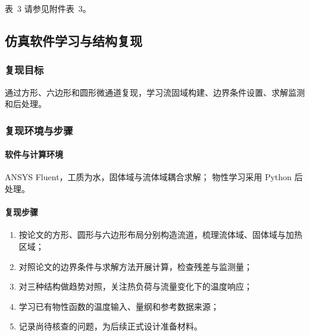 \documentclass[stage1,fontset=fandol]{ydzjreport}
\makeatletter
\newcommand{\submissionnumber}[1]{\def\@currentlabel{#1}}
\makeatother
\begin{document}
\par\noindent \begingroup\submissionnumber{3}\label{tab:notes-cont-5}\endgroup 表~3 请参见附件表~3。\par





\subsection{仿真软件学习与结构复现}

\subsubsection{复现目标}

通过方形、六边形和圆形微通道复现，学习流固域构建、边界条件设置、求解监测和后处理。

\subsubsection{复现环境与步骤}

	\paragraph{软件与计算环境}
ANSYS Fluent，工质为水，固体域与流体域耦合求解；
	物性学习采用 Python 后处理。

	\paragraph{复现步骤}


	\begin{enumerate}
		\item 按论文的方形、圆形与六边形布局分别构造流道，梳理流体域、固体域与加热区域；
		\item 对照论文的边界条件与求解方法开展计算，检查残差与监测量；
		\item 对三种结构做趋势对照，关注热负荷与流量变化下的温度响应；
		\item 学习已有物性函数的温度输入、量纲和参考数据来源；
		\item 记录尚待核查的问题，为后续正式设计准备材料。
	\end{enumerate}
\end{document}
